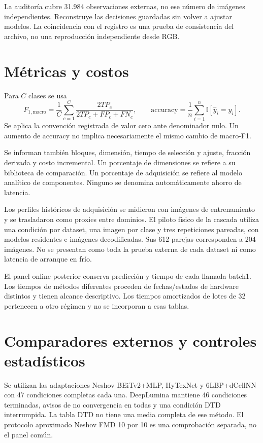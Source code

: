 La auditoría cubre 31.984 observaciones externas, no ese número de imágenes independientes. Reconstruye las decisiones guardadas sin volver a ajustar modelos. La coincidencia con el registro es una prueba de consistencia del archivo, no una reproducción independiente desde RGB.

\section{Métricas y costos}
Para \(C\) clases se usa
\begin{equation}
F_{1,\mathrm{macro}}=\frac1C\sum_{c=1}^{C}
\frac{2TP_c}{2TP_c+FP_c+FN_c},\qquad
\mathrm{accuracy}=\frac{1}{n}\sum_{i=1}^{n}\mathbb I[\widehat y_i=y_i].
\label{eq:tk-metrics}
\end{equation}
Se aplica la convención registrada de valor cero ante denominador nulo. Un aumento de accuracy no implica necesariamente el mismo cambio de macro-F1.

Se informan también bloques, dimensión, tiempo de selección y ajuste, fracción derivada y costo incremental. Un porcentaje de dimensiones se refiere a su biblioteca de comparación. Un porcentaje de adquisición se refiere al modelo analítico de componentes. Ninguno se denomina automáticamente ahorro de latencia.

Los perfiles históricos de adquisición se midieron con imágenes de entrenamiento y se trasladaron como proxies entre dominios. El piloto físico de la cascada utiliza una condición por dataset, una imagen por clase y tres repeticiones pareadas, con modelos residentes e imágenes decodificadas. Sus 612 parejas corresponden a 204 imágenes. No se presentan como toda la prueba externa de cada dataset ni como latencia de arranque en frío.

El panel online posterior conserva predicción y tiempo de cada llamada batch1. Los tiempos de métodos diferentes proceden de fechas/estados de hardware distintos y tienen alcance descriptivo. Los tiempos amortizados de lotes de 32 pertenecen a otro régimen y no se incorporan a esas tablas.

\section{Comparadores externos y controles estadísticos}
Se utilizan las adaptaciones Neshov BEiTv2+MLP, HyTexNet y 6LBP+dCellNN con 47 condiciones completas cada una. DeepLumina mantiene 46 condiciones terminadas, avisos de no convergencia en todas y una condición DTD interrumpida. La tabla DTD no tiene una media completa de ese método. El protocolo aproximado Neshov FMD 10 por 10 es una comprobación separada, no el panel común.

